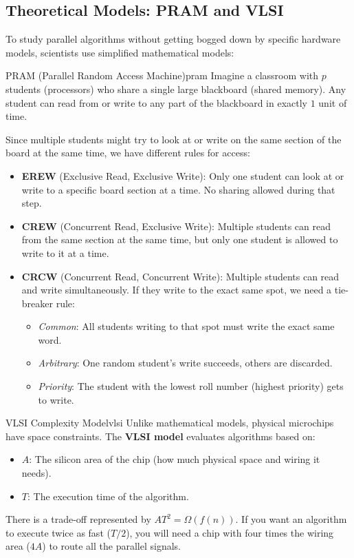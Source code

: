 \documentclass[11pt,a4paper]{article}
\begin{document}
\subsection{Theoretical Models: PRAM and VLSI}

To study parallel algorithms without getting bogged down by specific hardware models, scientists use simplified mathematical models:

\begin{definition}{PRAM (Parallel Random Access Machine)}{pram}
Imagine a classroom with $p$ students (processors) who share a single large blackboard (shared memory). Any student can read from or write to any part of the blackboard in exactly $1$ unit of time. 
\end{definition}

Since multiple students might try to look at or write on the same section of the board at the same time, we have different rules for access:
\begin{itemize}
    \item \textbf{EREW} (Exclusive Read, Exclusive Write): Only one student can look at or write to a specific board section at a time. No sharing allowed during that step.
    \item \textbf{CREW} (Concurrent Read, Exclusive Write): Multiple students can read from the same section at the same time, but only one student is allowed to write to it at a time.
    \item \textbf{CRCW} (Concurrent Read, Concurrent Write): Multiple students can read and write simultaneously. If they write to the exact same spot, we need a tie-breaker rule:
    \begin{itemize}
        \item \textit{Common}: All students writing to that spot must write the exact same word.
        \item \textit{Arbitrary}: One random student's write succeeds, others are discarded.
        \item \textit{Priority}: The student with the lowest roll number (highest priority) gets to write.
    \end{itemize}
\end{itemize}

\begin{definition}{VLSI Complexity Model}{vlsi}
Unlike mathematical models, physical microchips have space constraints. The \textbf{VLSI model} evaluates algorithms based on:
\begin{itemize}
    \item $A$: The silicon area of the chip (how much physical space and wiring it needs).
    \item $T$: The execution time of the algorithm.
\end{itemize}
There is a trade-off represented by $AT^2 = \Omega(f(n))$. If you want an algorithm to execute twice as fast ($T/2$), you will need a chip with four times the wiring area ($4A$) to route all the parallel signals.
\end{definition}
\end{document}
